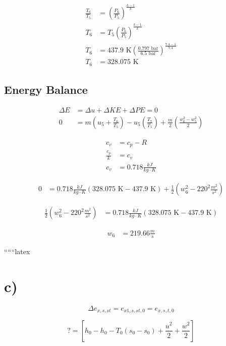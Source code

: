 \begin{align*}
\frac{T_6}{T_5} &= \left( \frac{P_6}{P_5} \right)^{\frac{k-1}{k}} \\
T_6 &= T_5 \left( \frac{P_6}{P_5} \right)^{\frac{k-1}{k}} \\
T_6 &= 437.9 \text{ K} \left( \frac{0.797 \text{ bar}}{6.5 \text{ bar}} \right)^{\frac{7.4-1}{7.4}} \\
T_6 &= 328.075 \text{ K}
\end{align*}

\subsection*{Energy Balance}

\begin{align*}
\Delta E &= \Delta u + \Delta KE + \Delta PE = 0 \\
0 &= m \left( u_5 + \frac{T_6}{T_5} \right) - u_5 \left( \frac{T_7}{T_5} \right) + \frac{m}{2} \left( \frac{w_6^2 - w_5^2}{2} \right)
\end{align*}

\begin{align*}
c_v &= c_p - R \\
\frac{c_p}{k} &= c_v \\
c_v &= 0.718 \frac{kJ}{kg \cdot K}
\end{align*}

\begin{align*}
0 &= 0.718 \frac{kJ}{kg \cdot K} \left( 328.075 \text{ K} - 437.9 \text{ K} \right) + \frac{1}{2} \left( w_6^2 - 220^2 \frac{m^2}{s^2} \right)
\end{align*}

\begin{align*}
\frac{1}{2} \left( w_6^2 - 220^2 \frac{m^2}{s^2} \right) &= 0.718 \frac{kJ}{kg \cdot K} \left( 328.075 \text{ K} - 437.9 \text{ K} \right)
\end{align*}

\begin{align*}
w_6 &= 219.66 \frac{m}{s}
\end{align*}

``````latex

\section*{c)}

\[
\Delta e_{x,s,st} = e_{x1,s,st,0} = e_{x,s,t,0}
\]

\[
? = \left[ h_0 - h_0 - T_0 \left( s_0 - s_0 \right) + \frac{u^2}{2} + \frac{w^2}{2} \right]
\]

